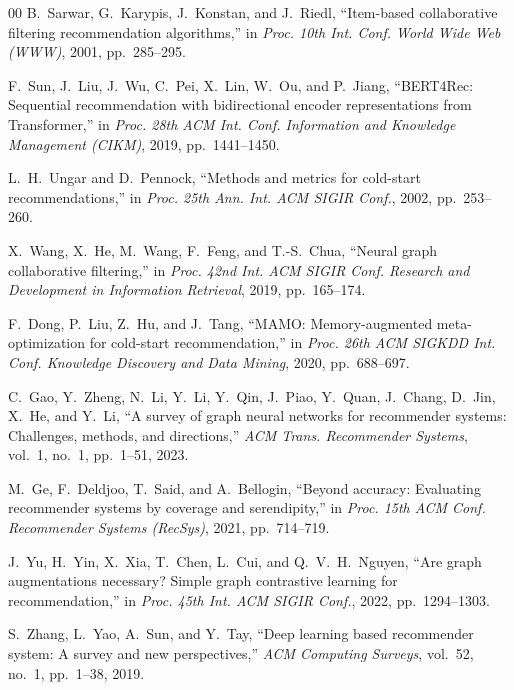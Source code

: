 \documentclass[conference]{IEEEtran}
\begin{document}
\begin{thebibliography}{00}
B.~Sarwar, G.~Karypis, J.~Konstan, and J.~Riedl,
``Item-based collaborative filtering recommendation algorithms,''
in \emph{Proc. 10th Int. Conf. World Wide Web (WWW)}, 2001, pp.~285--295.

F.~Sun, J.~Liu, J.~Wu, C.~Pei, X.~Lin, W.~Ou, and P.~Jiang,
``BERT4Rec: Sequential recommendation with bidirectional encoder
representations from Transformer,''
in \emph{Proc. 28th ACM Int. Conf. Information and Knowledge Management
(CIKM)}, 2019, pp.~1441--1450.

L.~H.~Ungar and D.~Pennock,
``Methods and metrics for cold-start recommendations,''
in \emph{Proc. 25th Ann. Int. ACM SIGIR Conf.}, 2002, pp.~253--260.

X.~Wang, X.~He, M.~Wang, F.~Feng, and T.-S.~Chua,
``Neural graph collaborative filtering,''
in \emph{Proc. 42nd Int. ACM SIGIR Conf. Research and Development in
Information Retrieval}, 2019, pp.~165--174.

F.~Dong, P.~Liu, Z.~Hu, and J.~Tang,
``MAMO: Memory-augmented meta-optimization for cold-start recommendation,''
in \emph{Proc. 26th ACM SIGKDD Int. Conf. Knowledge Discovery and Data Mining},
2020, pp.~688--697.

C.~Gao, Y.~Zheng, N.~Li, Y.~Li, Y.~Qin, J.~Piao, Y.~Quan, J.~Chang,
D.~Jin, X.~He, and Y.~Li,
``A survey of graph neural networks for recommender systems: Challenges,
methods, and directions,''
\emph{ACM Trans. Recommender Systems}, vol.~1, no.~1, pp.~1--51, 2023.

M.~Ge, F.~Deldjoo, T.~Said, and A.~Bellogin,
``Beyond accuracy: Evaluating recommender systems by coverage and serendipity,''
in \emph{Proc. 15th ACM Conf. Recommender Systems (RecSys)}, 2021,
pp.~714--719.

J.~Yu, H.~Yin, X.~Xia, T.~Chen, L.~Cui, and Q.~V.~H.~Nguyen,
``Are graph augmentations necessary? Simple graph contrastive learning
for recommendation,''
in \emph{Proc. 45th Int. ACM SIGIR Conf.}, 2022, pp.~1294--1303.

S.~Zhang, L.~Yao, A.~Sun, and Y.~Tay,
``Deep learning based recommender system: A survey and new perspectives,''
\emph{ACM Computing Surveys}, vol.~52, no.~1, pp.~1--38, 2019.

\end{thebibliography}
\end{document}
